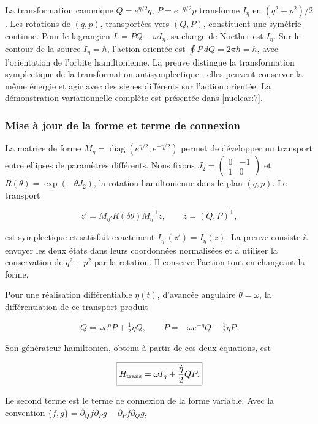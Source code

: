 La transformation canonique \(Q=e^{\eta/2}q\), \(P=e^{-\eta/2}p\) transforme \(I_\eta\) en \((q^2+p^2)/2\). Les rotations de \((q,p)\), transportées vers \((Q,P)\), constituent une symétrie continue. Pour le lagrangien \(L=P\dot Q-\omega I_\eta\), sa charge de Noether est \(I_\eta\). Sur le contour de la source \(I_\eta=\hbar\), l’action orientée est \(\oint P\,dQ=2\pi\hbar=h\), avec l’orientation de l’orbite hamiltonienne. La preuve distingue la transformation symplectique de la transformation antisymplectique : elles peuvent conserver la même énergie et agir avec des signes différents sur l’action orientée. La démonstration variationnelle complète est présentée dans \cref{nuclear:7}.

\subsubsection{Mise à jour de la forme et terme de connexion
}

La matrice de forme \(M_\eta=\operatorname{diag}(e^{\eta/2},e^{-\eta/2})\) permet de développer un transport entre ellipses de paramètres différents. Nous fixons \(J_2=
\begin{pmatrix}0&-1\\1&0\end{pmatrix}\) et \(R(\theta)=\exp(-\theta J_2)\), la rotation hamiltonienne dans le plan \((q,p)\). Le transport

\[
z'=M_{\eta'}R(\delta\theta)M_\eta^{-1}z,
\qquad z=(Q,P)^\mathsf T,
\]

est symplectique et satisfait exactement \(I_{\eta'}(z')=I_\eta(z)\). La preuve consiste à envoyer les deux états dans leurs coordonnées normalisées et à utiliser la conservation de \(q^2+p^2\) par la rotation. Il conserve l’action tout en changeant la forme.

Pour une réalisation différentiable \(\eta(t)\), d’avancée angulaire \(\dot\theta=\omega\), la différentiation de ce transport produit


\[
\dot Q=\omega e^\eta P+\tfrac12\dot\eta Q,\qquad
\dot P=-\omega e^{-\eta}Q-\tfrac12\dot\eta P.
\]

Son générateur hamiltonien, obtenu à partir de ces deux équations, est


\begin{equation}
\boxed{H_{\rm trans}=\omega I_\eta+\frac{\dot\eta}{2}QP.}\label{nuc02:eq:7}
\end{equation}

Le second terme est le terme de connexion de la forme variable. Avec la convention \(\{f,g\}=\partial_Qf\partial_Pg-\partial_Pf\partial_Qg\),



